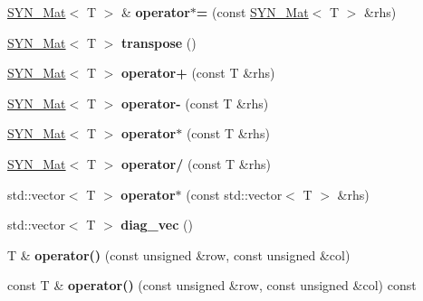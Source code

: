 \begin{DoxyCompactItemize}
\item 
\mbox{\label{classSYN__Mat_a4e7c3bf2add1eff8340bfb0ee370d9a7}} 
\hyperlink{classSYN__Mat}{S\+Y\+N\+\_\+\+Mat}$<$ T $>$ \& {\bfseries operator$\ast$=} (const \hyperlink{classSYN__Mat}{S\+Y\+N\+\_\+\+Mat}$<$ T $>$ \&rhs)
\item 
\mbox{\label{classSYN__Mat_ae7abe122e4fff8c1349092f1433b621a}} 
\hyperlink{classSYN__Mat}{S\+Y\+N\+\_\+\+Mat}$<$ T $>$ {\bfseries transpose} ()
\item 
\mbox{\label{classSYN__Mat_a798ff5d5995916b0eb1f73beccfcd46b}} 
\hyperlink{classSYN__Mat}{S\+Y\+N\+\_\+\+Mat}$<$ T $>$ {\bfseries operator+} (const T \&rhs)
\item 
\mbox{\label{classSYN__Mat_a144f03048627b72926ce073e1cf7a731}} 
\hyperlink{classSYN__Mat}{S\+Y\+N\+\_\+\+Mat}$<$ T $>$ {\bfseries operator-\/} (const T \&rhs)
\item 
\mbox{\label{classSYN__Mat_aa6e7809760f004c41a7cf80459064788}} 
\hyperlink{classSYN__Mat}{S\+Y\+N\+\_\+\+Mat}$<$ T $>$ {\bfseries operator$\ast$} (const T \&rhs)
\item 
\mbox{\label{classSYN__Mat_a7d70fe600d7bbe193c20162b3f0679fc}} 
\hyperlink{classSYN__Mat}{S\+Y\+N\+\_\+\+Mat}$<$ T $>$ {\bfseries operator/} (const T \&rhs)
\item 
\mbox{\label{classSYN__Mat_a161e81b525a7f8dde96d071e21b21958}} 
std\+::vector$<$ T $>$ {\bfseries operator$\ast$} (const std\+::vector$<$ T $>$ \&rhs)
\item 
\mbox{\label{classSYN__Mat_a6e344855dbfa80bc534e04b1e66c90f5}} 
std\+::vector$<$ T $>$ {\bfseries diag\+\_\+vec} ()
\item 
\mbox{\label{classSYN__Mat_ad9dd55a5a6c9151ee309940a693c7d1d}} 
T \& {\bfseries operator()} (const unsigned \&row, const unsigned \&col)
\item 
\mbox{\label{classSYN__Mat_ace7256e781e5dd3f71c53fb62f4c5fcd}} 
const T \& {\bfseries operator()} (const unsigned \&row, const unsigned \&col) const

\end{DoxyCompactItemize}

